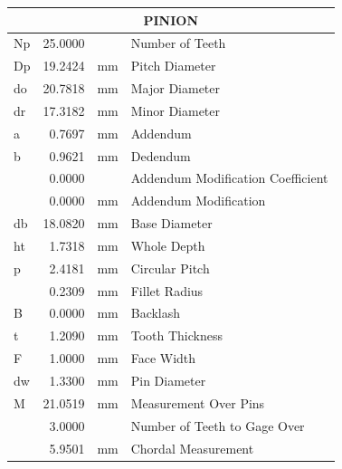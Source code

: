 \begin{appendices}
    \begin{center}
    \begin{tabular}{|l|r|l|l|}
    \hline
    \multicolumn{4}{|c|}{\textbf{PINION}} \\ \hline
    Np & 25.0000 &  & Number of Teeth \\ \hline
    Dp & 19.2424 & mm & Pitch Diameter \\ \hline
    do & 20.7818 & mm & Major Diameter \\ \hline
    dr & 17.3182 & mm & Minor Diameter \\ \hline
    a & 0.7697 & mm & Addendum \\ \hline
    b & 0.9621 & mm & Dedendum \\ \hline
     & 0.0000 &  & Addendum Modification Coefficient \\ \hline
     & 0.0000 & mm & Addendum Modification \\ \hline
    db & 18.0820 & mm & Base Diameter \\ \hline
    ht & 1.7318 & mm & Whole Depth \\ \hline
    p & 2.4181 & mm & Circular Pitch \\ \hline
     & 0.2309 & mm & Fillet Radius \\ \hline
    B & 0.0000 & mm & Backlash \\ \hline
    t & 1.2090 & mm & Tooth Thickness \\ \hline
    F & 1.0000 & mm & Face Width \\ \hline
    dw & 1.3300 & mm &   Pin Diameter \\ \hline
    M & 21.0519 & mm &   Measurement Over Pins \\ \hline
     & 3.0000 &  &   Number of Teeth to Gage Over \\ \hline
     & 5.9501 & mm &   Chordal Measurement \\ \hline
    \end{tabular}
    \end{center}


\end{appendices}
